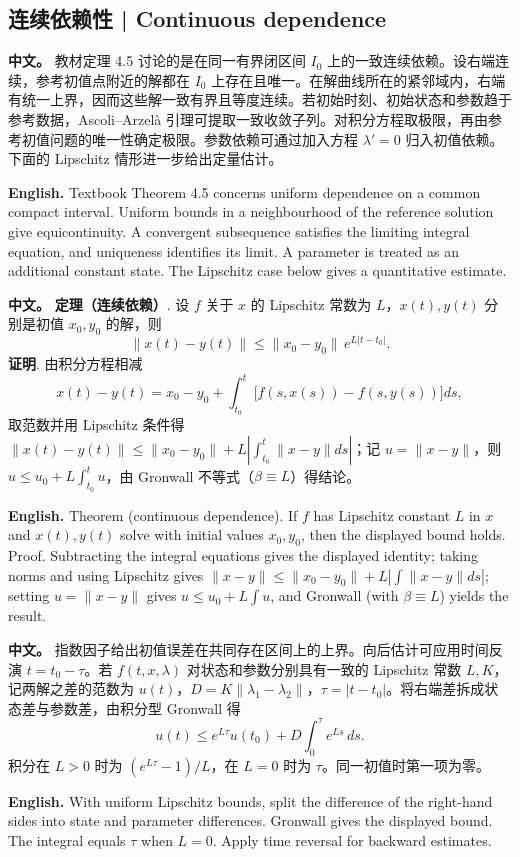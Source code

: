 \documentclass[UTF8,11pt,a4paper]{ctexart}
\newcommand{\APS}[2]{\par\noindent\textbf{中文。} #1\par\noindent\textbf{English.} #2\par}
\begin{document}
\subsection{连续依赖性 | Continuous dependence}
\APS{教材定理 4.5 讨论的是在同一有界闭区间 $I_0$ 上的一致连续依赖。设右端连续，参考初值点附近的解都在 $I_0$ 上存在且唯一。在解曲线所在的紧邻域内，右端有统一上界，因而这些解一致有界且等度连续。若初始时刻、初始状态和参数趋于参考数据，Ascoli--Arzel\`a 引理可提取一致收敛子列。对积分方程取极限，再由参考初值问题的唯一性确定极限。参数依赖可通过加入方程 $\lambda'=0$ 归入初值依赖。下面的 Lipschitz 情形进一步给出定量估计。}{Textbook Theorem 4.5 concerns uniform dependence on a common compact interval. Uniform bounds in a neighbourhood of the reference solution give equicontinuity. A convergent subsequence satisfies the limiting integral equation, and uniqueness identifies its limit. A parameter is treated as an additional constant state. The Lipschitz case below gives a quantitative estimate.}
\APS{\textbf{定理（连续依赖）}. 设 $f$ 关于 $x$ 的 Lipschitz 常数为 $L$，$x(t),y(t)$ 分别是初值 $x_0,y_0$ 的解，则
\[
\|x(t)-y(t)\|\le\|x_0-y_0\|\,e^{L|t-t_0|}.
\]
\textbf{证明}. 由积分方程相减
\[
x(t)-y(t)=x_0-y_0+\int_{t_0}^{t}\bigl[f(s,x(s))-f(s,y(s))\bigr]ds,
\]
取范数并用 Lipschitz 条件得 $\|x(t)-y(t)\|\le\|x_0-y_0\|+L\left|\int_{t_0}^t\|x-y\|ds\right|$；记 $u=\|x-y\|$，则 $u\le u_0+L\int_{t_0}^t u$，由 Gronwall 不等式（$\beta\equiv L$）得结论。}{Theorem (continuous dependence). If $f$ has Lipschitz constant $L$ in $x$ and $x(t),y(t)$ solve with initial values $x_0,y_0$, then the displayed bound holds. Proof. Subtracting the integral equations gives the displayed identity; taking norms and using Lipschitz gives $\|x-y\|\le\|x_0-y_0\|+L\left|\int\|x-y\|ds\right|$; setting $u=\|x-y\|$ gives $u\le u_0+L\int u$, and Gronwall (with $\beta\equiv L$) yields the result.}
\APS{指数因子给出初值误差在共同存在区间上的上界。向后估计可应用时间反演 $t=t_0-\tau$。若 $f(t,x,\lambda)$ 对状态和参数分别具有一致的 Lipschitz 常数 $L,K$，记两解之差的范数为 $u(t)$，$D=K\|\lambda_1-\lambda_2\|$，$\tau=|t-t_0|$。将右端差拆成状态差与参数差，由积分型 Gronwall 得
\[
u(t)\le e^{L\tau}u(t_0)+D\int_0^\tau e^{Ls}\,ds.
\]
积分在 $L>0$ 时为 $(e^{L\tau}-1)/L$，在 $L=0$ 时为 $\tau$。同一初值时第一项为零。}{With uniform Lipschitz bounds, split the difference of the right-hand sides into state and parameter differences. Gronwall gives the displayed bound. The integral equals $\tau$ when $L=0$. Apply time reversal for backward estimates.}
\end{document}
